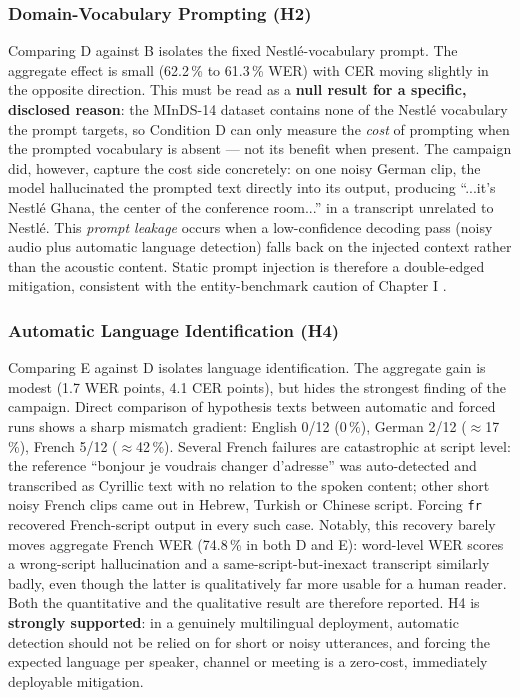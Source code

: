 \documentclass[12pt]{report}
\begin{document}
\subsubsection{Domain-Vocabulary Prompting (H2)}

Comparing D against B isolates the fixed Nestl\'e-vocabulary prompt. The aggregate effect is small (62.2\,\% to 61.3\,\% WER) with CER moving slightly in the opposite direction. This must be read as a \textbf{null result for a specific, disclosed reason}: the MInDS-14 dataset contains none of the Nestl\'e vocabulary the prompt targets, so Condition D can only measure the \emph{cost} of prompting when the prompted vocabulary is absent --- not its benefit when present. The campaign did, however, capture the cost side concretely: on one noisy German clip, the model hallucinated the prompted text directly into its output, producing \enquote{...it's Nestl\'e Ghana, the center of the conference room...} in a transcript unrelated to Nestl\'e. This \emph{prompt leakage} occurs when a low-confidence decoding pass (noisy audio plus automatic language detection) falls back on the injected context rather than the acoustic content. Static prompt injection is therefore a double-edged mitigation, consistent with the entity-benchmark caution of Chapter I \cite{durmus2026contextual}.

\subsubsection{Automatic Language Identification (H4)}

Comparing E against D isolates language identification. The aggregate gain is modest (1.7 WER points, 4.1 CER points), but hides the strongest finding of the campaign. Direct comparison of hypothesis texts between automatic and forced runs shows a sharp mismatch gradient: English 0/12 (0\,\%), German 2/12 ($\approx$17\,\%), French 5/12 ($\approx$42\,\%). Several French failures are catastrophic at script level: the reference \enquote{bonjour je voudrais changer d'adresse} was auto-detected and transcribed as Cyrillic text with no relation to the spoken content; other short noisy French clips came out in Hebrew, Turkish or Chinese script. Forcing \texttt{fr} recovered French-script output in every such case. Notably, this recovery barely moves aggregate French WER (74.8\,\% in both D and E): word-level WER scores a wrong-script hallucination and a same-script-but-inexact transcript similarly badly, even though the latter is qualitatively far more usable for a human reader. Both the quantitative and the qualitative result are therefore reported. H4 is \textbf{strongly supported}: in a genuinely multilingual deployment, automatic detection should not be relied on for short or noisy utterances, and forcing the expected language per speaker, channel or meeting is a zero-cost, immediately deployable mitigation.
\end{document}
